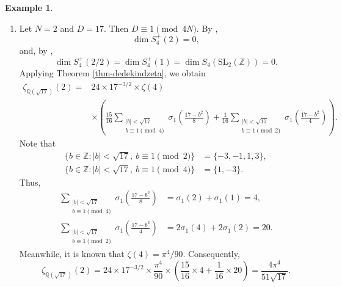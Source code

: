 \documentclass[12pt]{amsart}
\numberwithin{equation}{section}
\theoremstyle{definition}
\newtheorem{example}{Example}[section]
\begin{document}
\begin{example}
    \begin{enumerate}
        \item[(i)] Let $N=2$ and $D=17$. Then $D\equiv 1\pmod{4N}$. By \cite[Lemma 2.2]{CK13},
        $$\dim S_{4}^{+}(2)=0,$$
        and, by \cite[Corollary 8.8]{K92},
        $$\dim S_{4}^{+}(2/2)=\dim S_{4}^{+}(1)=\dim S_{4}(\mathrm{SL}_{2}(\mathbb{Z}))=0.$$
        Applying Theorem \ref{thm-dedekindzeta}, we obtain
        \begin{align*}
            \zeta_{\mathbb{Q}(\sqrt{17})}(2)=&24\times  17^{-3/2}\times\zeta(4)\\
            &\times\left(\frac{15}{16}\sum\limits_{\substack{|b|<\sqrt{17} \\ b\equiv 1\pmod{4}}}\sigma_{1}\left(\frac{17-b^{2}}{8}\right)+\frac{1}{16}\sum\limits_{\substack{|b|<\sqrt{17} \\ b\equiv 1\pmod{2}}}\sigma_{1}\left(\frac{17-b^{2}}{4}\right)\right).
        \end{align*}
        Note that
        \begin{align*}
            \{b\in\mathbb{Z}:|b|<\sqrt{17},~b\equiv 1\pmod{2}\}&=\{-3,-1,1,3\},\\
            \{b\in\mathbb{Z}:|b|<\sqrt{17},~b\equiv 1\pmod{4}\}&=\{1,-3\}.
        \end{align*}
        Thus,
        \begin{align*}
            \sum\limits_{\substack{|b|<\sqrt{17} \\ b\equiv 1\pmod{4}}}\sigma_{1}\left(\frac{17-b^{2}}{8}\right)&=\sigma_{1}(2)+\sigma_{1}(1)=4,\\
            \sum\limits_{\substack{|b|<\sqrt{17} \\ b\equiv 1\pmod{2}}}\sigma_{1}\left(\frac{17-b^{2}}{4}\right)&=2\sigma_{1}(4)+2\sigma_{1}(2)=20.
        \end{align*}
        Meanwhile, it is known that $\zeta(4)=\pi^{4}/90$. Consequently,
        $$\zeta_{\mathbb{Q}(\sqrt{17})}(2)=24\times 17^{-3/2}\times\frac{\pi^{4}}{90}\times\left(\frac{15}{16}\times 4+\frac{1}{16}\times 20\right)=\frac{4\pi^{4}}{51\sqrt{17}}.$$


\end{enumerate}
\end{example}
\end{document}
